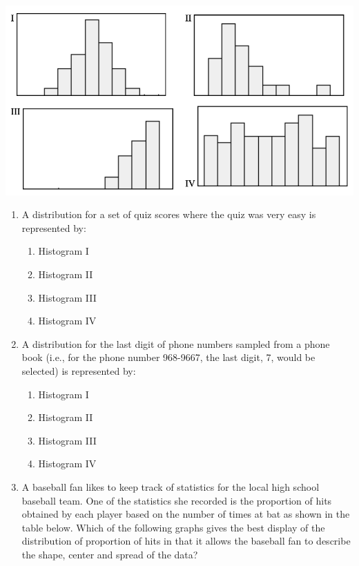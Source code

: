 \documentclass[11pt]{umnthesis}
\begin{document}
\begin{center}\includegraphics[width=0.8\linewidth]{figure/drs-01} \end{center}

\begin{enumerate}
\def\labelenumi{\arabic{enumi}.}
\tightlist
\item
  A distribution for a set of quiz scores where the quiz was very easy is represented by:

  \begin{enumerate}
  \def\labelenumii{\alph{enumii}.}
  \tightlist
  \item
    Histogram I
  \item
    Histogram II
  \item
    Histogram III
  \item
    Histogram IV
  \end{enumerate}
\item
  A distribution for the last digit of phone numbers sampled from a phone book (i.e., for the phone number 968-9667, the last digit, 7, would be selected) is represented by:

  \begin{enumerate}
  \def\labelenumii{\alph{enumii}.}
  \tightlist
  \item
    Histogram I
  \item
    Histogram II
  \item
    Histogram III
  \item
    Histogram IV
  \end{enumerate}
\item
  A baseball fan likes to keep track of statistics for the local high school baseball team. One of the statistics she recorded is the proportion of hits obtained by each player based on the number of times at bat as shown in the table below. Which of the following graphs gives the best display of the distribution of proportion of hits in that it allows the baseball fan to describe the shape, center and spread of the data?
\end{enumerate}
\end{document}
